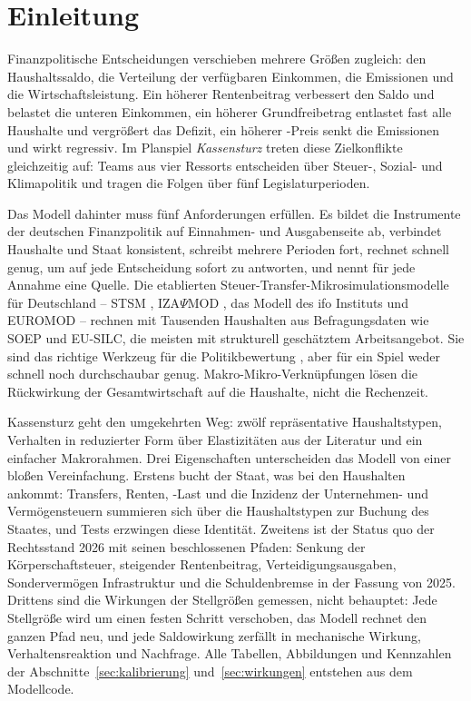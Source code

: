 
\section{Einleitung}
\label{sec:einleitung}

Finanzpolitische Entscheidungen verschieben mehrere Größen zugleich: den
Haushaltssaldo, die Verteilung der verfügbaren Einkommen, die Emissionen und
die Wirtschaftsleistung. Ein höherer Rentenbeitrag verbessert den Saldo und
belastet die unteren Einkommen, ein höherer Grundfreibetrag entlastet fast
alle Haushalte und vergrößert das Defizit, ein höherer \COz-Preis senkt die
Emissionen und wirkt regressiv. Im Planspiel \emph{Kassensturz} treten diese
Zielkonflikte gleichzeitig auf: Teams aus vier Ressorts entscheiden über
Steuer-, Sozial- und Klimapolitik und tragen die Folgen über fünf
Legislaturperioden.

Das Modell dahinter muss fünf Anforderungen erfüllen. Es bildet die
Instrumente der deutschen Finanzpolitik auf Einnahmen- und Ausgabenseite ab,
verbindet Haushalte und Staat konsistent, schreibt mehrere Perioden fort,
rechnet schnell genug, um auf jede Entscheidung sofort zu antworten, und nennt
für jede Annahme eine Quelle. Die etablierten
Steuer-Transfer-Mikrosimulationsmodelle für Deutschland -- STSM
\parencite{steiner2012}, IZA$\Psi$MOD \parencite{peichl2010}, das Modell des
ifo Instituts \parencite{bloemer2020} und EUROMOD \parencite{sutherland2013}
-- rechnen mit Tausenden Haushalten aus Befragungsdaten wie SOEP und
EU-SILC, die meisten mit strukturell geschätztem Arbeitsangebot. Sie sind das
richtige Werkzeug für die Politikbewertung
\parencite{bourguignon2006}, aber für ein Spiel weder schnell noch durchschaubar
genug. Makro-Mikro-Verknüpfungen \parencite{bourguignon2008} lösen die
Rückwirkung der Gesamtwirtschaft auf die Haushalte, nicht die Rechenzeit.

Kassensturz geht den umgekehrten Weg: zwölf repräsentative Haushaltstypen,
Verhalten in reduzierter Form über Elastizitäten aus der Literatur und ein
einfacher Makrorahmen. Drei Eigenschaften unterscheiden das Modell von einer
bloßen Vereinfachung. Erstens bucht der Staat, was bei den Haushalten
ankommt: Transfers, Renten, \COz-Last und die Inzidenz der Unternehmen- und
Vermögensteuern summieren sich über die Haushaltstypen zur Buchung des
Staates, und Tests erzwingen diese Identität. Zweitens ist der Status quo der
Rechtsstand 2026 mit seinen beschlossenen Pfaden: Senkung der
Körperschaftsteuer, steigender Rentenbeitrag, Verteidigungsausgaben,
Sondervermögen Infrastruktur und die Schuldenbremse in der Fassung von 2025.
Drittens sind die Wirkungen der Stellgrößen gemessen, nicht behauptet: Jede
Stellgröße wird um einen festen Schritt verschoben, das Modell rechnet den
ganzen Pfad neu, und jede Saldowirkung zerfällt in mechanische Wirkung,
Verhaltensreaktion und Nachfrage. Alle Tabellen, Abbildungen und Kennzahlen der
Abschnitte~\ref{sec:kalibrierung} und~\ref{sec:wirkungen} entstehen aus dem
Modellcode.

